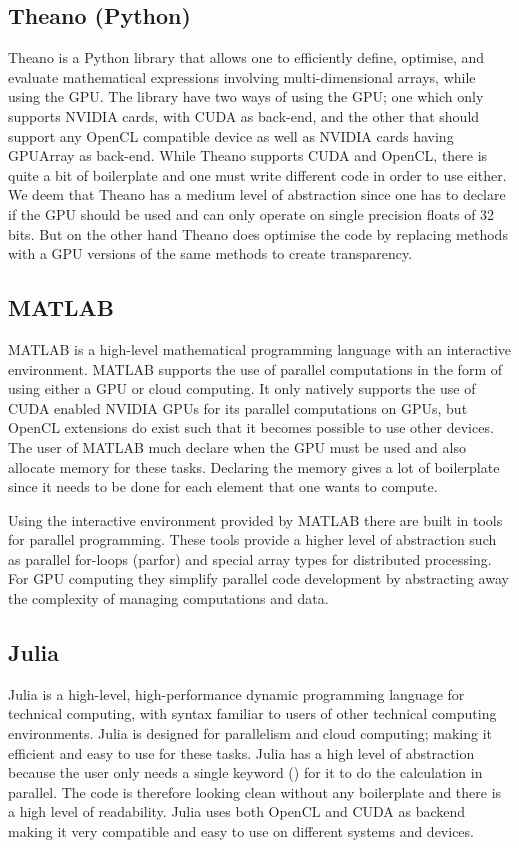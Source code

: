 \subsection{Theano (Python)}
Theano is a Python library that allows one to efficiently define, optimise, and evaluate mathematical expressions involving multi-dimensional arrays, while using the GPU.
The library have two ways of using the GPU; one which only supports NVIDIA cards, with CUDA as back-end, and the other that should support any OpenCL compatible device as well as NVIDIA cards having GPUArray as back-end.
While Theano supports CUDA and OpenCL, there is quite a bit of boilerplate and one must write different code in order to use either.
We deem that Theano has a medium level of abstraction since one has to declare if the GPU should be used and can only operate on single precision floats of 32 bits.
But on the other hand Theano does optimise the code by replacing methods with a GPU versions of the same methods to create transparency.\citep{Theano,Theano_GPU}

\subsection{MATLAB}
MATLAB is a high-level mathematical programming language with an interactive environment.
MATLAB supports the use of parallel computations in the form of using either a GPU or cloud computing.
It only natively supports the use of CUDA enabled NVIDIA GPUs for its parallel computations on GPUs, but OpenCL extensions do exist such that it becomes possible to use other devices.
The user of MATLAB much declare when the GPU must be used and also allocate memory for these tasks.
Declaring the memory gives a lot of boilerplate since it needs to be done for each element that one wants to compute.\citep{MATLAB_backend,MATLAB_benchmark,}

Using the interactive environment provided by MATLAB there are built in tools for parallel programming.
These tools provide a higher level of abstraction such as parallel for-loops (parfor) and special array types for distributed processing.
For GPU computing they simplify parallel code development by abstracting away the complexity of managing computations and data.\citep{MATLAB_parallel}

\subsection{Julia}
Julia is a high-level, high-performance dynamic programming language for technical computing, with syntax familiar to users of other technical computing environments.
Julia is designed for parallelism and cloud computing; making it efficient and easy to use for these tasks.
Julia has a high level of abstraction because the user only needs a single keyword (\@parallel) for it to do the calculation in parallel.
The code is therefore looking clean without any boilerplate and there is a high level of readability.
Julia uses both OpenCL and CUDA as backend making it very compatible and easy to use on different systems and devices.\citep{Julia_Git,Julia}

